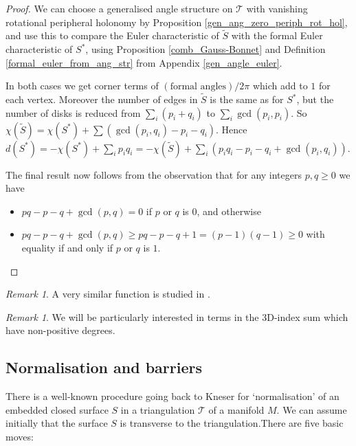 \documentclass[12pt,reqno]{amsart}  %
\theoremstyle{definition}
\theoremstyle{remark}
\newtheorem{rmk}[thm]{Remark}
\newcommand{\T}{\mathcal{T}}
\begin{document}
\begin{proof} 
We can choose a generalised angle structure on $\T$ with vanishing 
rotational peripheral holonomy by 
Proposition \ref{gen_ang_zero_periph_rot_hol},  and use this to compare 
the Euler characteristic of $\tilde S$ 
with the formal Euler characteristic of $S^*$, using 
Proposition \ref{comb_Gauss-Bonnet} and 
Definition \ref{formal_euler_from_ang_str} from Appendix \ref{gen_angle_euler}.

In both cases we get corner terms of $(\text{formal angles})/2\pi$ which 
add to $1$ for each vertex. 
Moreover the number of edges in $\tilde S$ is the same as for $S^*$, but 
the number of disks is reduced from $\sum_i (p_i+q_i)$ to 
$\sum_i \gcd(p_i,p_i)$.  So
$\chi(\tilde S)= \chi(S^*) + \sum ( \gcd(p_i,q_i) - p_i -q_i )$. Hence
$d(S^*) = - \chi(S^*) + \sum_i p_i q_i = -\chi(\tilde S)
+ \sum_i (p_i q_i - p_i - q_i + \gcd(p_i,q_i)).$

\smallskip
The final result now follows from the observation that for any integers 
$p, q \ge 0$ we have
\begin{itemize}
\item $pq - p - q + \gcd(p,q) = 0$ if $p$ or $q$ is $0$, and otherwise
\item $pq - p - q + \gcd(p,q) \ge pq-p-q+1 =(p-1)(q-1) \ge 0$ with equality 
if and only if $p$ or $q$ is $1$.
\end{itemize}
\end{proof}

\begin{rmk}  
A very similar function is studied in \cite[Section 4.1]{FrKa}.
\end{rmk}

\begin{rmk} 
We will be particularly interested in terms in the 3D-index sum which 
have non-positive degrees. 
\end{rmk}

\subsection{Normalisation and barriers}
\label{barriers}

There is a well-known procedure going back to Kneser \cite{Kn} for 
`normalisation' of an embedded closed surface $S$ in a triangulation $\T$ 
of a manifold $M$. We can assume initially that the surface $S$ is 
transverse to the triangulation.There are five basic moves: 
\end{document}
